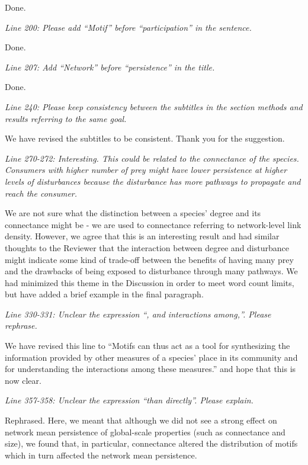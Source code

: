 \documentclass[12pt]{article}
\newcommand{\us}{\rm \setlength{\leftskip}{0.3cm} \setlength{\rightskip}{0.3cm}}
\newcommand{\them}{\it \setlength{\leftskip}{0cm} \setlength{\rightskip}{0cm}}
\begin{document}
\us
Done.

\them
Line 200: Please add “Motif” before “participation” in the sentence.

\us
Done.

\them
Line 207: Add “Network” before “persistence” in the title.

\us
Done.

\them
Line 240: Please keep consistency between the subtitles in the section methods and results referring to the same goal.

\us We have revised the subtitles to be consistent. Thank you for the suggestion.

\them
Line 270-272: Interesting. This could be related to the connectance of the species. Consumers with higher number of prey might have lower persistence at higher levels of disturbances because the disturbance has more pathways to propagate and reach the consumer.

\us We are not sure what the distinction between a species' degree and its connectance might be - we are used to connectance referring to network-level link density. 
However, we agree that this is an interesting result and had similar thoughts to the Reviewer that the interaction between degree and disturbance might indicate some kind of trade-off between the benefits of having many prey and the drawbacks of being exposed to disturbance through many pathways.
We had minimized this theme in the Discussion in order to meet word count limits, but have added a brief example in the final paragraph.


\them
Line 330-331: Unclear the expression “, and interactions among,”. Please rephrase.

\us We have revised this line to ``Motifs can thus act as a tool for synthesizing the information provided by other measures of a species' place in its community and for understanding the interactions among these measures.'' and hope that this is now clear.

\them
Line 357-358: Unclear the expression “than directly”. Please explain.

\us
Rephrased. Here, we meant that although we did not see a strong effect on network mean persistence of global-scale properties (such as connectance and size), we found that, in particular, connectance altered the distribution of motifs which in turn affected the network mean persistence.  
\end{document}

